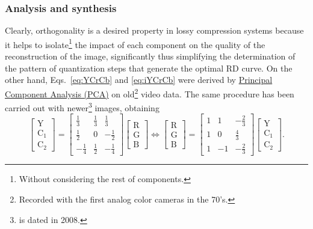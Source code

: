 \subsubsection{Analysis and synthesis}
Clearly, orthogonality is a desired property in lossy compression
systems because it helps to isolate\footnote{Without considering the
rest of components.} the impact of each component on the quality of
the reconstruction of the image, significantly thus simplifying the
determination of the pattern of quantization steps that generate the
optimal RD curve. On the other hand, Eqs.~\ref{eq:YCrCb} and
\ref{eq:iYCrCb} were derived by
\href{https://en.wikipedia.org/wiki/Principal_component_analysis}{Principal
  Component Analysis (PCA)} on old\footnote{Recorded with the first
analog color cameras in the 70's.} video data. The same procedure has
been carried out with newer\footnote{\cite{malvar2008lifting} is dated
in 2008.} images, obtaining
\begin{equation}
  \begin{bmatrix}
    \text{Y} \\
    \text{C}_1 \\
    \text{C}_2
  \end{bmatrix}
  =
  \begin{bmatrix}
    \frac{1}{3} & \frac{1}{3} &  \frac{1}{3} \\ 
    \frac{1}{2} &           0 & -\frac{1}{2} \\
   -\frac{1}{4} & \frac{1}{2} & -\frac{1}{4}
  \end{bmatrix}
  \begin{bmatrix}
    \text{R} \\
    \text{G} \\
    \text{B}
  \end{bmatrix}
  \Leftrightarrow
  \begin{bmatrix}
    \text{R} \\
    \text{G} \\
    \text{B}
  \end{bmatrix}
  =
  \begin{bmatrix}
    1  &  1  & -\frac{2}{3} \\ 
    1  &  0  &  \frac{4}{3} \\ 
    1  & -1  & -\frac{2}{3}
  \end{bmatrix}
  \begin{bmatrix}
    \text{Y} \\
    \text{C}_1 \\
    \text{C}_2
  \end{bmatrix}.
  \label{eq:optimal}
\end{equation}

